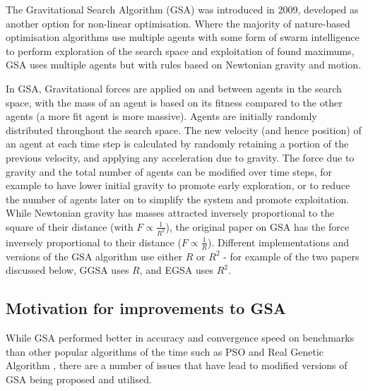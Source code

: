 The Gravitational Search Algorithm (GSA) \cite{GSA} was introduced in 2009, developed as another option for non-linear optimisation.
Where the majority of nature-based optimisation algorithms use multiple agents with some form of swarm intelligence to perform exploration of the search space and exploitation of found maximums, GSA uses multiple agents but with rules based on Newtonian gravity and motion.

In GSA, Gravitational forces are applied on and between agents in the search space, with the mass of an agent is based on its fitness compared to the other agents (a more fit agent is more massive).
Agents are initially randomly distributed throughout the search space.
The new velocity (and hence position) of an agent at each time step is calculated by randomly retaining a portion of the previous velocity, and applying any acceleration due to gravity.
The force due to gravity and the total number of agents can be modified over time steps, for example to have lower initial gravity to promote early exploration, or to reduce the number of agents later on to simplify the system and promote exploitation.
While Newtonian gravity has masses attracted inversely proportional to the square of their distance (with $F \propto \frac{1}{R^2}$), the original paper on GSA has the force inversely proportional to their distance ($F \propto \frac{1}{R}$).
Different implementations and versions of the GSA algorithm use either $R$ or $R^2$ - for example of the two papers discussed below, GGSA uses $R$, and EGSA uses $R^2$.


\subsection{Motivation for improvements to GSA}\label{sec:alg:gsa:motiviation}
While GSA performed better in accuracy and convergence speed on benchmarks than other popular algorithms of the time such as PSO and Real Genetic Algorithm \cite{GSA}, there are a number of issues that have lead to modified versions of GSA being proposed and utilised.

